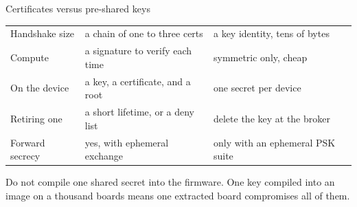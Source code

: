 \documentclass[10pt,aspectratio=169,t]{beamer}
\begin{document}
\begin{frame}[embedded,eyebrow=Trust]{Certificates versus pre-shared keys}
  \vskip 1mm
  { \begin{tabular}{@{}l>{\raggedright\arraybackslash}p{42mm}>{\raggedright\arraybackslash}p{44mm}@{}}
    \toprule
    \thead{} & \multicolumn{1}{l}{\thead{X.509 certificates}} & \multicolumn{1}{l@{}}{\thead{Pre-shared keys}} \\
    \midrule
    Handshake size & a chain of one to three certs & a key identity, tens of bytes \\
    Compute        & a signature to verify each time & symmetric only, cheap \\
    On the device  & a key, a certificate, and a root & one secret per device \\
    Retiring one   & a short lifetime, or a deny list & delete the key at the broker \\
    Forward secrecy & yes, with ephemeral exchange & only with an ephemeral PSK suite \\
    \bottomrule
  \end{tabular}}
  \begin{takeaway}{Do not compile one shared secret into the firmware.}
    One key compiled into an image on a thousand boards means one extracted board compromises all of them.
  \end{takeaway}
\end{frame}
\end{document}
